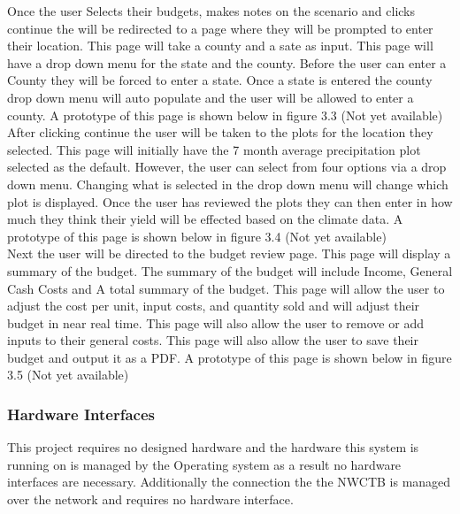 \documentclass[onecolumn, draftclsnofoot,10pt, compsoc]{article}
\begin{document}
					Once the user Selects their budgets, makes notes on the scenario and clicks continue the will be redirected to a page where they will be prompted to enter their location. This page will take a county and a sate as input. This page will have a drop down menu for the state and the county. Before the user can enter a County they will be forced to enter a state. Once a state is entered the county drop down menu will auto populate and the user will be allowed to enter a county. A prototype of this page is shown below in figure 3.3 (Not yet available)\\

					After clicking continue the user will be taken to the plots for the location they selected. This page will initially have the 7 month average precipitation plot selected as the default. However, the user can select from four options via a drop down menu. Changing what is selected in the drop down menu will change which plot is displayed. Once the user has reviewed the plots they can then enter in how much they think their yield will be effected based on the climate data. A prototype of this page is shown below in figure 3.4 (Not yet available)\\

					Next the user will be directed to the budget review page. This page will display a summary of the budget. The summary of the budget will include Income, General Cash Costs and A total summary of the budget. This page will allow the user to adjust the cost per unit, input costs, and quantity sold and will adjust their budget in near real time. This page will also allow the user to remove or add inputs to their general costs. This page will also allow the user to save their budget and output it as a PDF. A prototype of this page is shown below in figure 3.5 (Not yet available)\\


        \subsubsection{Hardware Interfaces}
					This project requires no designed hardware and the hardware this system is running on is managed by the Operating system as a result no hardware interfaces are necessary. Additionally the connection the the NWCTB is managed over the network and requires no hardware interface.\\
\end{document}
